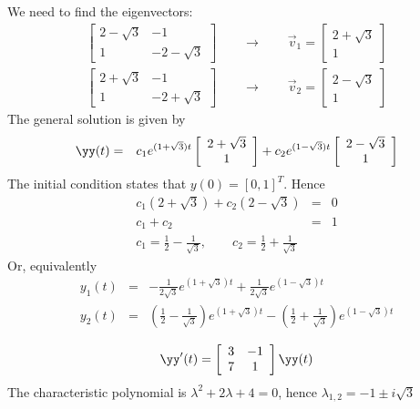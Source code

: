 We need to find the eigenvectors:
\begin{eqnarray*}
\left[\begin{array}{cc}2-\sqrt{3}&-1\\1&-2-\sqrt{3}\end{array}\right]\qquad\rightarrow\qquad
\vec{v}_1=\left[\begin{array}{c}2+\sqrt{3}\\1\end{array}\right]\\
\left[\begin{array}{cc}2+\sqrt{3}&-1\\1&-2+\sqrt{3}\end{array}\right]\qquad\rightarrow\qquad
\vec{v}_2=\left[\begin{array}{c}2-\sqrt{3}\\1\end{array}\right]
\end{eqnarray*}
The general solution is given by
\begin{eqnarray*}
\yy(t)&=&c_1e^{(1+\sqrt{3})t}\left[\begin{array}{c}2+\sqrt{3}\\ 1\end{array}\right] + c_2e^{(1-\sqrt{3})t}\left[\begin{array}{c}2-\sqrt{3}\\1\end{array}\right]
\end{eqnarray*}
The initial condition states that $y(0)=[0,1]^T$. Hence
\begin{eqnarray*}
  c_1(2+\sqrt{3})+c_2(2-\sqrt{3})&=&0\\c_1+c_2&=&1\\
	c_1=\frac{1}{2}-\frac{1}{\sqrt{3}},\qquad c_2=\frac{1}{2}+\frac{1}{\sqrt{3}}
\end{eqnarray*}
Or, equivalently
\begin{eqnarray*}
y_1(t)&=&-\frac{1}{2\sqrt{3}} e^{(1+\sqrt{3})t} + \frac{1}{2\sqrt{3}}e^{(1-\sqrt{3})t}\\
y_2(t)&=&\left(\frac{1}{2}-\frac{1}{\sqrt{3}}\right)e^{(1+\sqrt{3})t} - \left(\frac{1}{2}+\frac{1}{\sqrt{3}}\right) e^{(1-\sqrt{3})t}
\end{eqnarray*}

\vspace{2mm}
$$
\yy'(t)=\left[\begin{array}{cc}3&-1\\7&1\end{array}\right]\yy(t)
$$
The characteristic polynomial is $\lambda^2+2\lambda+4=0$, hence $\lambda_{1,2}=-1\pm i\sqrt{3}$

